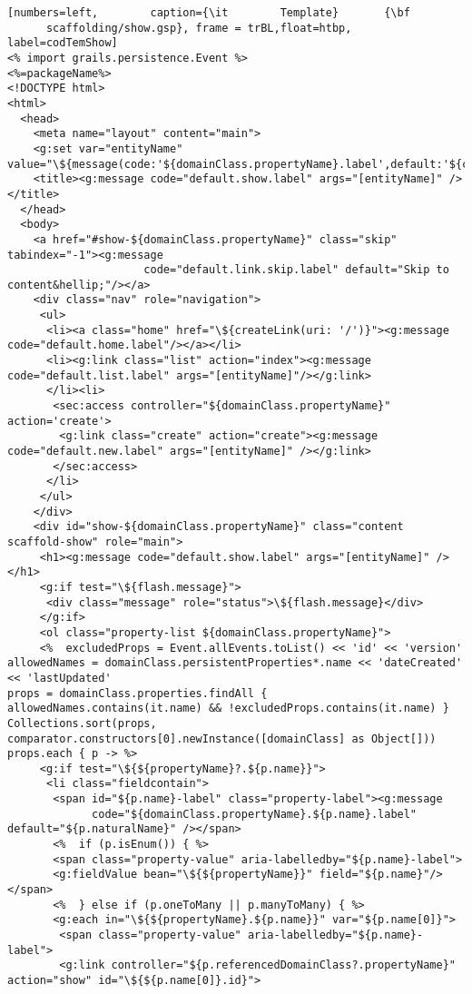 \begin{lstlisting}[numbers=left,        caption={\it        Template}       {\bf
      scaffolding/show.gsp}, frame = trBL,float=htbp, label=codTemShow] 
<% import grails.persistence.Event %>
<%=packageName%>
<!DOCTYPE html>
<html>
  <head>
    <meta name="layout" content="main">
    <g:set var="entityName" value="\${message(code:'${domainClass.propertyName}.label',default:'${className}')}"/>
    <title><g:message code="default.show.label" args="[entityName]" /></title>
  </head>
  <body>
    <a href="#show-${domainClass.propertyName}" class="skip" tabindex="-1"><g:message 
                     code="default.link.skip.label" default="Skip to content&hellip;"/></a>
    <div class="nav" role="navigation">
     <ul>
      <li><a class="home" href="\${createLink(uri: '/')}"><g:message code="default.home.label"/></a></li>
      <li><g:link class="list" action="index"><g:message code="default.list.label" args="[entityName]"/></g:link>
      </li><li>
       <sec:access controller="${domainClass.propertyName}" action='create'>
        <g:link class="create" action="create"><g:message code="default.new.label" args="[entityName]" /></g:link>
       </sec:access>
      </li>
     </ul>
    </div>
    <div id="show-${domainClass.propertyName}" class="content scaffold-show" role="main">
     <h1><g:message code="default.show.label" args="[entityName]" /></h1>
     <g:if test="\${flash.message}">
      <div class="message" role="status">\${flash.message}</div>
     </g:if>
     <ol class="property-list ${domainClass.propertyName}">
     <%  excludedProps = Event.allEvents.toList() << 'id' << 'version'
allowedNames = domainClass.persistentProperties*.name << 'dateCreated' << 'lastUpdated'
props = domainClass.properties.findAll { allowedNames.contains(it.name) && !excludedProps.contains(it.name) }
Collections.sort(props, comparator.constructors[0].newInstance([domainClass] as Object[]))
props.each { p -> %>
     <g:if test="\${${propertyName}?.${p.name}}">
      <li class="fieldcontain">
       <span id="${p.name}-label" class="property-label"><g:message 
             code="${domainClass.propertyName}.${p.name}.label" default="${p.naturalName}" /></span>
       <%  if (p.isEnum()) { %>
       <span class="property-value" aria-labelledby="${p.name}-label">
       <g:fieldValue bean="\${${propertyName}}" field="${p.name}"/></span>
       <%  } else if (p.oneToMany || p.manyToMany) { %>
       <g:each in="\${${propertyName}.${p.name}}" var="${p.name[0]}">
        <span class="property-value" aria-labelledby="${p.name}-label">
        <g:link controller="${p.referencedDomainClass?.propertyName}" action="show" id="\${${p.name[0]}.id}">

\end{lstlisting}
